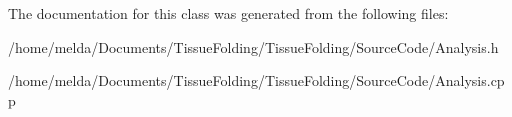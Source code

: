 The documentation for this class was generated from the following files\+:\begin{DoxyCompactItemize}
\item 
/home/melda/\+Documents/\+Tissue\+Folding/\+Tissue\+Folding/\+Source\+Code/Analysis.\+h\item 
/home/melda/\+Documents/\+Tissue\+Folding/\+Tissue\+Folding/\+Source\+Code/Analysis.\+cpp\end{DoxyCompactItemize}
